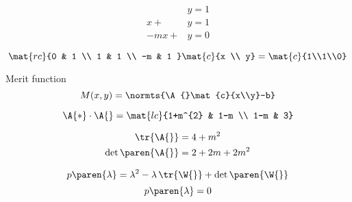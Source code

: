   \begin{equation*}   %
    \begin{split}
      &y = 1 \\
      x + &y = 1 \\
      -mx +&y = 0
    \end{split}
  \end{equation*}

  \begin{equation*}   %
      \mat{rc}{0 & 1 \\ 1 & 1 \\ -m & 1 } 
      \mat{c}{x \\ y} = 
      \mat{c}{1\\1\\0}
  \end{equation*}

Merit function
  \begin{equation*}   %
      M(x,y) = \normts{\A{}\mat{c}{x\\y}-b}
  \end{equation*}

  \begin{equation*}   %
      \A{*} \cdot \A{} = 
      \mat{lc}{1+m^{2} & 1-m \\ 1-m & 3}
  \end{equation*}

  \begin{equation*}   %
    \begin{split}
      \tr {\A{}} &= 4 + m^{2} \\
      \det \paren{\A{}} &= 2 + 2m + 2m^{2}
    \end{split}
  \end{equation*}

  \begin{equation*}   %
      p\paren{\lambda} = \lambda^{2} - \lambda \, \tr{\W{}} + \det\paren{\W{}}
  \end{equation*}
  \begin{equation*}   %
      p\paren{\lambda} = 0
  \end{equation*}

